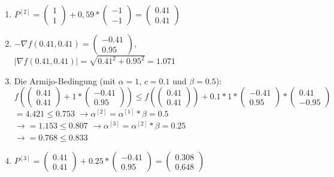 \documentclass[naustrian]{article}
\begin{document}
{\begin{enumerate}
    \item
    $P^{[2]} = \left( \begin{array}{c} 1 \\ 1 \end{array} \right) + 0,59 * \left( \begin{array}{c} -1 \\ -1 \end{array} \right) = \left( \begin{array}{c} 0.41 \\ 0.41 \end{array} \right)$
    \item
    $-{\nabla}f(0.41,0.41) = \left( \begin{array}{c} -0.41 \\ 0.95 \end{array} \right)$, \\
	$|{\nabla}f(0.41,0.41)| = \sqrt{0.41^2+0.95^2} = 1.071$
	\item
	Die Armijo-Bedingung (mit $\alpha = 1$, $c = 0.1$ und $\beta = 0.5$):\\
	$f( \left( \begin{array}{c} 0.41 \\ 0.41 \end{array} \right) + 1 * \left( \begin{array}{c} -0.41 \\ 0.95 \end{array} \right)) \leq f(\left( \begin{array}{c} 0.41 \\ 0.41 \end{array} \right)) + 0.1 * 1 *  \left( \begin{array}{c} -0.41 \\ 0.95 \end{array} \right) * \left( \begin{array}{c} 0.41 \\ -0.95 \end{array} \right)$ \\
	$= 4.421 \leq 0.753$
	$\rightarrow \alpha^{[2]} = \alpha^{[1]} * \beta = 0.5$ \\
	$\rightarrow = 1.153 \leq 0.807$
	$\rightarrow \alpha^{[3]} = \alpha^{[2]} * \beta = 0.25$ \\
	$\rightarrow = 0.768 \leq 0.833$
	\item
	$P^{[3]} = \left( \begin{array}{c} 0.41 \\ 0.41 \end{array} \right) + 0.25 * \left( \begin{array}{c} -0.41 \\ 0.95 \end{array} \right) = \left( \begin{array}{c} 0.308 \\ 0.648 \end{array} \right)$

\end{enumerate}}
\end{document}
